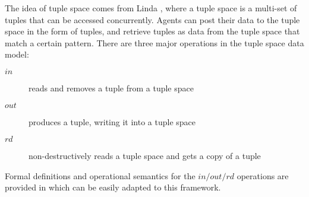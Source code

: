 The idea of tuple space comes from Linda \cite{Gelernter85:Linda}, where
a tuple space is a multi-set of tuples that can be accessed concurrently.
Agents can post their data to the tuple space in the form of tuples, and retrieve tuples as data from the tuple space that match a certain pattern.
There are three major operations in the tuple space data model:
\begin{description}
\item[$in$] reads and removes a tuple from a tuple space
\item[$out$] produces a tuple, writing it into a tuple space
\item[$rd$] non-destructively reads a tuple space and gets a copy of a tuple
\end{description}
Formal definitions and operational semantics for
the $in/out/rd$ operations are provided in \cite{Ciancarini95}
which can be easily adapted to this framework.

